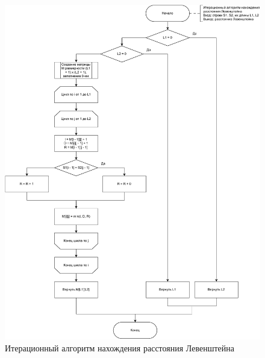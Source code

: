 \begin{figure}[h]
	\centering
	\includegraphics[scale=0.5]{img/lev_ifm.pdf}
	\caption{Итерационный алгоритм нахождения расстояния Левенштейна}
	\label{fig:lifm}
\end{figure}

